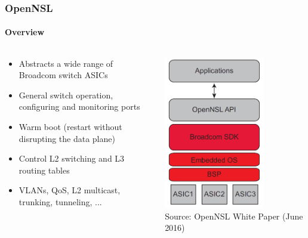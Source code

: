 \documentclass[12pt]{beamer}
\begin{document}
\begin{frame}
\frametitle{OpenNSL}
\framesubtitle{Overview}
\begin{columns}
\begin{column}{0.5\textwidth}
\begin{itemize}
    \item Abstracts a wide range of Broadcom switch ASICs
    \item General switch operation, configuring and monitoring ports
    \item Warm boot (restart without disrupting the data plane)
    \item Control L2 switching and L3 routing tables
    \item VLANs, QoS, L2 multicast, trunking, tunneling, ...
\end{itemize}
\end{column}
\begin{column}{0.5\textwidth}
\center
\includegraphics[width=0.7\textwidth]{images/opennsl_components.png}\\
\scriptsize Source: OpenNSL White Paper (June 2016)
\end{column}
\end{columns}
\end{frame}
\end{document}

